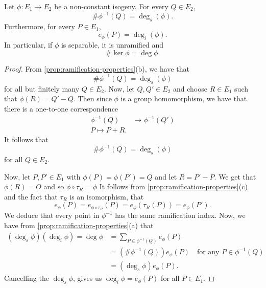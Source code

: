 \begin{theorem}
	\label{thm:preimage-card}
	Let $\phi: E_1 \to E_2$ be a non-constant isogeny.
	For every $Q\in E_2$,
	\begin{equation*}
		\#\phi^{-1}(Q) = \deg_s(\phi).
	\end{equation*}
	Furthermore, for every $P \in E_1$,
	\begin{equation*}
		e_\phi(P) = \deg_i(\phi).
	\end{equation*}
	In particular, if $\phi$ is separable, it is unramified and
	\begin{equation*}
		\# \ker\phi = \deg \phi.
	\end{equation*}
\end{theorem}
\begin{proof}
	From \ref{prop:ramification-properties}(b), we have that 
	\begin{equation*}
		\#\phi^{-1}(Q) = \deg_s(\phi)
	\end{equation*}
	for all but finitely many $Q\in E_2$. Now, let $Q, Q' \in E_2$ and choose
	$R \in E_1$ such that $\phi(R) = Q' - Q$. Then since $\phi$ is a group
	homomorphism, we have that there is a one-to-one correspondence
	\begin{align*}
		\phi^{-1}(Q) &\to \phi^{-1}(Q')\\
		P \mapsto P + R.
	\end{align*}
	It follows that 
	\begin{equation*}
		\#\phi^{-1}(Q) = \deg_s(\phi)
	\end{equation*}
	for all $Q \in E_2$.

	Now, let $P, P' \in E_1$ with $\phi(P) = \phi(P') = Q$ and let $R = P' - P$.
	We get that $\phi(R) = O$ and so $\phi\circ\tau_R = \phi$
	It follows from \ref{prop:ramification-properties}(c) and the fact
	that $\tau_R$ is an isomorphism, that
	\begin{equation*}
		e_\phi(P) = e_{\phi\circ\tau_R}(P) =
		e_\phi(\tau_R(P)) = e_\phi(P').
	\end{equation*}
	We deduce that every point in $\phi^{-1}$ has the same ramification index.
	Now, we have from \ref{prop:ramification-properties}(a) that
	\begin{align*}
		(\deg_s\phi)(\deg_i\phi) = \deg\phi
		&= \sum_{P \in \phi^{-1}(Q)}e_\phi(P)\\
		&= (\#\phi^{-1}(Q))e_\phi(P)\quad\textrm{for any }P \in \phi^{-1}(Q)\\
		&= (\deg_s\phi)e_\phi(P).
	\end{align*}
	Cancelling the $\deg_s\phi$, gives us $\deg_i\phi = e_\phi(P)$
	for all $P \in E_1$.
\end{proof}

